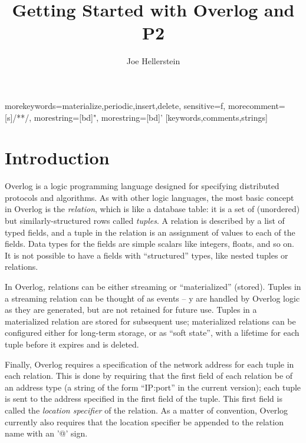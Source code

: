 \documentclass{article}
\title{Getting Started with Overlog and P2}
\author{Joe Hellerstein}
\begin{document}
\date{}
\maketitle

%
  {morekeywords={materialize,periodic,insert,delete},%
   sensitive=f,%
   morecomment=[s]{/*}{*/},%
   morestring=[bd]",%
   morestring=[bd]'%
  }[keywords,comments,strings]%



\section{Introduction}
Overlog is a logic programming language designed for specifying
distributed protocols and algorithms.  As with other logic languages,
the most basic concept in Overlog is the {\em relation}, which is like
a database table: it is a set of (unordered) but similarly-structured
rows called {\em tuples}.  A relation is described by a list of typed
fields, and a tuple in the relation is an assignment of values to each
of the fields.  Data types for the fields are simple scalars like
integers, floats, and so on. It is not possible to have a fields with
``structured'' types, like nested tuples or relations.

In Overlog, relations can be either streaming or ``materialized''
(stored).  Tuples in a streaming relation can be thought of as events
-- y are handled by Overlog logic as they are generated, but
are not retained for future use.  Tuples in a materialized relation
are stored for subsequent use; materialized relations can be
configured either for long-term storage, or as ``soft state'', with a
lifetime for each tuple before it expires and is deleted.

Finally, Overlog requires a specification of the network address for
each tuple in each relation.  This is done by requiring that the first
field of each relation be of an address type (a string of the form
``IP:port'' in the current version); each tuple is sent to the address
specified in the first field of the tuple.  This first field is called
the {\em location specifier} of the relation.  As a matter of convention,
Overlog currently also requires that the location specifier be
appended to the relation name with an '@' sign. 
\end{document}

